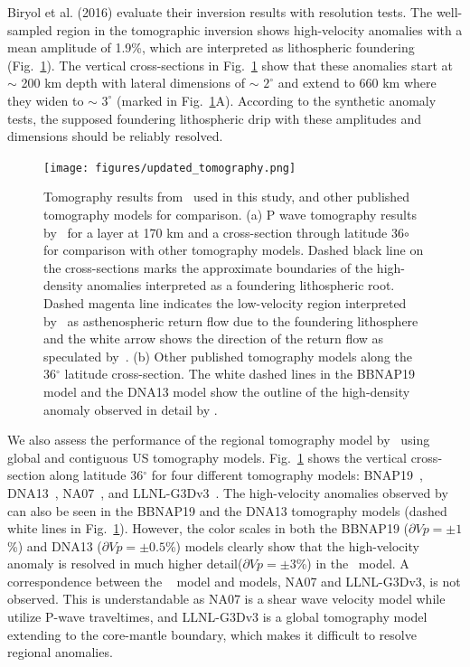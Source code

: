 \documentclass[draft,linenumbers]{agujournal2018}
\begin{document}
    Biryol et al. (2016) evaluate their inversion results with resolution tests. The well-sampled region in the tomographic inversion shows high-velocity anomalies with a mean amplitude of 1.9\%, which are interpreted as lithospheric foundering (Fig.~\ref{fig_tomo}). The vertical cross-sections in Fig.~\ref{fig_tomo} show that these anomalies start at $\sim$ 200 km depth with lateral dimensions of  $\sim$ $2^\circ$ and extend to 660 km where they widen to $\sim$ $3^\circ$ (marked in Fig.~\ref{fig_tomo}A). According to the synthetic anomaly tests, the supposed foundering lithospheric drip with these amplitudes and dimensions should be reliably resolved.
%
\begin{figure}[h!]
    \centering
    \texttt{[image: figures/updated\_tomography.png]}
    \caption{Tomography results from~\citet{Biryol_2016} used in this study, and other published tomography models for comparison. (a) P wave tomography results by~\citet{Biryol_2016} for a layer at 170 km and a cross-section through latitude 36$\circ$ for comparison with other tomography models. Dashed black line on the cross-sections marks the approximate boundaries of the high-density anomalies interpreted as a foundering lithospheric root. Dashed magenta line indicates the low-velocity region interpreted by~\citet{Biryol_2016} as asthenospheric return flow due to the foundering lithosphere and the white arrow shows the direction of the return flow as speculated by~\citet{Biryol_2016}. (b) Other published tomography models along the 36$^\circ$ latitude cross-section. The white dashed lines in the BBNAP19 model and the DNA13 model show the outline of the high-density anomaly observed in detail by \citet{Biryol_2016}.}
    \label{fig_tomo}
 \end{figure}
 
We also assess the performance of the regional tomography model by~\citet{Biryol_2016} using global and  contiguous US tomography models. Fig.~\ref{fig_tomo} shows the vertical cross-section along latitude 36$^\circ$ for four different tomography models: BNAP19~\citep[P-wave tomography model of the continental US concentrating on the upper mantle structure by][]{boyce2019variable}, DNA13~\citep[P-wave and S-wave velocity model for the contiguous US by][]{porritt2014seismic}, NA07~\citep[S-wave velocity model of the upper mantle in the North America by][]{bedle2009s}, and LLNL-G3Dv3~\citep[Global P-wave tomography model by][]{simmons2012llnl}. The high-velocity anomalies observed by~\citet{Biryol_2016} can also be seen in the BBNAP19 and the DNA13 tomography models (dashed white lines in Fig.~\ref{fig_tomo}). However, the color scales in both the BBNAP19 ($\partial Vp=\pm1$\%) and DNA13 ($\partial Vp=\pm0.5$\%) models clearly show that the high-velocity anomaly is resolved in much higher detail($\partial Vp=\pm3$\%) in the~\citet{Biryol_2016} model. A correspondence between the ~\citet{Biryol_2016} model and models, NA07 and LLNL-G3Dv3, is not observed. This is understandable as NA07 is a shear wave velocity model while~\citet{Biryol_2016} utilize P-wave traveltimes, and  LLNL-G3Dv3 is a global tomography model extending to the core-mantle boundary, which makes it difficult to resolve regional anomalies. 
\end{document}
